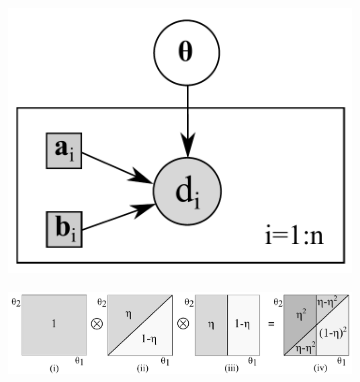 \begin{figure}%
\begin{subfigure}{.24\textwidth}
\centering
\includegraphics[width=1.0\textwidth]{pic/pref2w.pdf}
\end{subfigure}
\begin{subfigure}{.76\textwidth}
\centering
\includegraphics[width=1.0\textwidth]{pic/running1.pdf}
\label{fig:pref}
\end{subfigure}

\end{figure}
